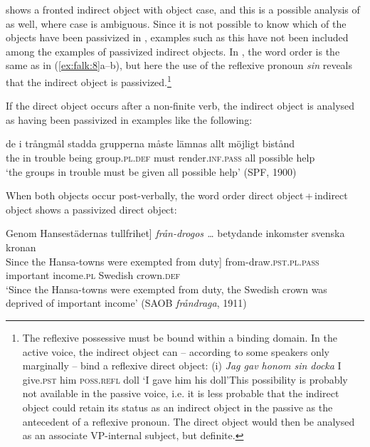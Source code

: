 \documentclass[output=paper]{langscibook}
\begin{document}
 shows a fronted indirect object with object case, and this is a possible analysis of  as well, where case is ambiguous. Since it is not possible to know which of the objects have been passivized in , examples such as this have not been included among the examples of passivized indirect objects. In , the word order is the same as in (\ref{ex:falk:8}a–b), but here the use of the reflexive pronoun \textit{sin} reveals that the indirect object is passivized.\footnote{The reflexive possessive must be bound within a binding domain. In the active voice, the indirect object can – according to some speakers only marginally – bind a reflexive direct object: (i)  \textit{Jag  gav    honom    sin    docka}  I      give.\textsc{pst}  him      \textsc{poss}.\textsc{refl}  doll  ‘I gave him his doll’This possibility is probably not available in the passive voice, i.e. it is less probable that the indirect object could retain its status as an indirect object in the passive as the antecedent of a reflexive pronoun. The direct object would then be analysed as an associate VP-internal subject, but definite.}


If the direct object occurs after a non-finite verb, the indirect object is analysed as having been passivized in examples like the following:

\ea%
    \label{ex:falk:9}
\gll de  i     trångmål  stadda  grupperna    måste  lämnas          allt  möjligt    bistånd\\
    the  in  trouble    being    group\textsc{.pl.def}   must  render\textsc{.inf}.\textsc{pass}  all    possible  help\\
\glt ‘the groups in trouble must be given all possible help’ (SPF, 1900)
\z


When both objects occur post-verbally, the word order direct object\,+\,indirect object shows a passivized direct object:

\ea%
    \label{ex:falk:10}
            {\ob}Genom Hansestädernas tullfrihet]               \textit{från-drogos …} betydande   inkomster  svenska    kronan \\
    {\ob}Since the Hansa-towns were exempted from duty]   from-draw\textsc{.pst.pl}.\textsc{pass}    important   income\textsc{.pl}  Swedish   crown.\textsc{def}\\
\glt ‘Since the Hansa-towns were exempted from duty, the Swedish crown was deprived of important income’ (SAOB \textit{fråndraga}, 1911)
\z
\end{document}
